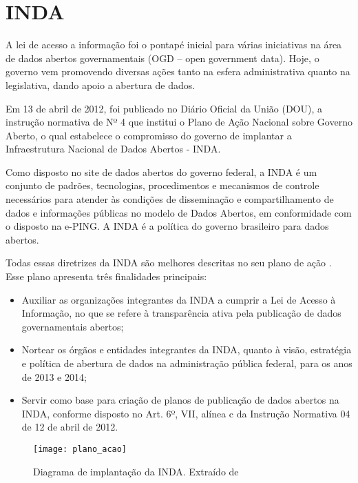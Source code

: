\section{INDA}
\label{sec-proc-sl}

A lei de acesso\cite{lai} a informação foi o pontapé inicial para várias iniciativas na área de dados abertos governamentais (OGD – open government data). Hoje, o governo vem promovendo diversas ações tanto na esfera administrativa quanto na legislativa, dando apoio a abertura de dados. 

Em 13 de abril de 2012, foi publicado no Diário Oficial da União (DOU), a instrução normativa de Nº 4 que institui o Plano de Ação Nacional sobre Governo Aberto, o qual estabelece o compromisso do governo de implantar a Infraestrutura Nacional de Dados Abertos - INDA.

Como disposto no site de dados abertos do governo federal, a INDA é um conjunto de padrões, tecnologias, procedimentos e mecanismos de controle necessários para atender às condições de disseminação e compartilhamento de dados e informações públicas no modelo de Dados Abertos, em conformidade com o disposto na e-PING. A INDA é a política do governo brasileiro para dados abertos.

Todas essas diretrizes da INDA são melhores descritas no seu plano de ação \cite{planoinda}. Esse plano apresenta três finalidades principais:

\begin{itemize}
	\item Auxiliar as organizações integrantes da INDA a cumprir a Lei de Acesso à Informação, no que se refere à transparência ativa pela publicação de dados governamentais abertos; 
	\item Nortear os órgãos e entidades integrantes da INDA, quanto à visão, estratégia e política de abertura de dados na administração pública federal, para os anos de 2013 e 2014;
	\item Servir como base para criação de planos de publicação de dados abertos na INDA, conforme disposto no Art. 6º, VII, alínea c da Instrução Normativa 04 de 12 de abril de 2012.
\end{itemize}

\graphicspath{{figuras/}}
\begin{figure}[H]
	\centering
	\texttt{[image: plano\_acao]}
	\caption{Diagrama de implantação da INDA. Extraído de \cite{planoinda}}
	\label{plano_acao}
\end{figure}

